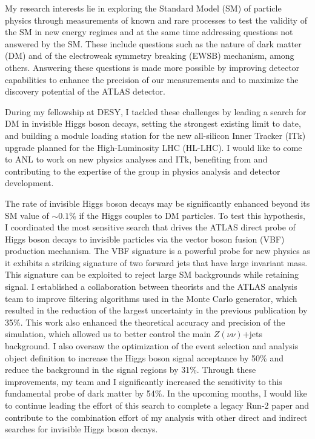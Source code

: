 \documentclass[a4paper]{article}
\begin{document}
\thispagestyle{fancy} 
 \lfoot{} \rfoot{\bf \thepage} \cfoot{}

\fontsize{11}{14}
\selectfont


My research interests lie in exploring the Standard Model (SM) of particle physics through measurements of known and rare processes
to test the validity of the SM in new energy regimes and at the same time addressing questions not answered by the SM.
These include questions such as the nature of dark matter (DM) and of the electroweak symmetry breaking (EWSB) mechanism, among others.
Answering these questions is made more possible by improving detector capabilities to enhance the precision of our measurements and to maximize the discovery potential of the ATLAS detector.

During my fellowship at DESY, I tackled these challenges by leading a search for DM in invisible Higgs boson decays, setting the strongest existing limit to date, and building a module loading station for the new all-silicon Inner Tracker (ITk) upgrade planned for the High-Luminosity LHC (HL-LHC). I would like to come to ANL to work on new physics analyses and ITk, benefiting from and contributing to the expertise of the group in physics analysis and detector development.

The rate of invisible Higgs boson decays may be significantly enhanced beyond its SM value of $\sim0.1\%$ if the Higgs couples to DM particles.
To test this hypothesis, I coordinated the most sensitive search that drives the ATLAS direct probe of Higgs boson decays to invisible particles via the vector boson fusion (VBF) production mechanism. The VBF signature is a powerful probe for new physics as it exhibits a striking signature of two forward jets that have large invariant mass. This signature can be exploited to reject large SM backgrounds while retaining signal.
I established a collaboration between theorists and the ATLAS analysis team to improve
filtering algorithms used in the Monte Carlo generator, which resulted in the reduction of the largest uncertainty in the previous publication by 35\%. This work also enhanced the theoretical accuracy and precision of the simulation, which allowed us to better control the main $Z\left(\nu\nu\right)$+jets background.
I also oversaw the optimization of the event selection and analysis object definition to increase the Higgs boson signal acceptance by 50\% and reduce the background in the signal regions by 31\%. Through these improvements, my team and I significantly increased the sensitivity to this fundamental probe of dark matter by 54\%. In the upcoming months, I would like to continue leading the effort of this search to complete a
legacy Run-2 paper and contribute to the combination effort of my analysis with other direct and indirect searches for invisible Higgs boson decays.
\end{document}
